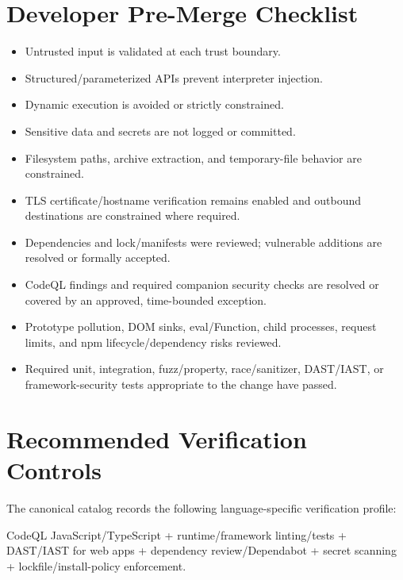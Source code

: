 \documentclass[10pt,letterpaper]{article}
\begin{document}
\section{Developer Pre-Merge Checklist}
\begin{itemize}[leftmargin=*,itemsep=2pt]
\item Untrusted input is validated at each trust boundary.
\item Structured/parameterized APIs prevent interpreter injection.
\item Dynamic execution is avoided or strictly constrained.
\item Sensitive data and secrets are not logged or committed.
\item Filesystem paths, archive extraction, and temporary-file behavior are constrained.
\item TLS certificate/hostname verification remains enabled and outbound destinations are constrained where required.
\item Dependencies and lock/manifests were reviewed; vulnerable additions are resolved or formally accepted.
\item CodeQL findings and required companion security checks are resolved or covered by an approved, time-bounded exception.
\item Prototype pollution, DOM sinks, eval/Function, child processes, request limits, and npm lifecycle/dependency risks reviewed.
\item Required unit, integration, fuzz/property, race/sanitizer, DAST/IAST, or framework-security tests appropriate to the change have passed.
\end{itemize}

\section{Recommended Verification Controls}
The canonical catalog records the following language-specific verification profile:

CodeQL JavaScript/TypeScript + runtime/framework linting/tests + DAST/IAST for web apps + dependency review/Dependabot + secret scanning + lockfile/install-policy enforcement.
\end{document}
